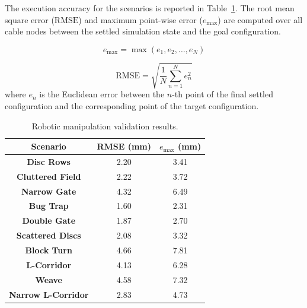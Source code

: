 \documentclass{pas}
\begin{document}
The execution accuracy for the scenarios is reported in
Table~\ref{tab:robotic_validation}. The root mean square error (\(\mathrm{RMSE}\)) and maximum point-wise error (\(e_{\max}\)) are computed over all cable nodes between the settled simulation state and the goal configuration.

\begin{equation}
    e_{\max} = \max(e_1, e_2, \dots, e_N)
\end{equation}

\begin{equation}
    \mathrm{RMSE} = \sqrt{\frac{1}{N}\sum_{n=1}^{N} e_n^2}
\end{equation}
where $e_n$ is the Euclidean error between the $n$-th point of the final settled configuration and the corresponding point of the target configuration.



\begin{table}[t]
    \centering
    \caption{Robotic manipulation validation results.}
    \label{tab:robotic_validation}
    \noindent
    \begin{tabular}{|c|c|c|}
        \hline
        \hfil \textbf{Scenario}\hfil & \hfil \textbf{RMSE (mm)}\hfil & \hfil \textbf{\(e_{\max}\) (mm)}\hfil \\
        \hline
         \textbf{Disc Rows}  &  2.20 &  3.41 \\ \hline
         \textbf{Cluttered Field}  &  2.22 &  3.72 \\ \hline
         \textbf{Narrow Gate}  &  4.32 &  6.49 \\ \hline
         \textbf{Bug Trap}  &  1.60 &  2.31 \\ \hline
         \textbf{Double Gate}  &  1.87 &  2.70 \\ \hline
         \textbf{Scattered Discs}  &  2.08 &  3.32 \\ \hline
         \textbf{Block Turn}  &  4.66 &  7.81 \\ \hline
         \textbf{L-Corridor}  &  4.13 &  6.28 \\ \hline
         \textbf{Weave}  &  4.58 &  7.32 \\ \hline
         \textbf{Narrow L-Corridor} &  2.83 &  4.73 \\ \hline
    \end{tabular}
\end{table}
\end{document}
